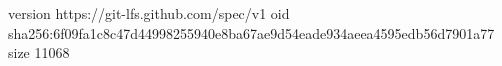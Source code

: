 version https://git-lfs.github.com/spec/v1
oid sha256:6f09fa1c8c47d44998255940e8ba67ae9d54eade934aeea4595edb56d7901a77
size 11068
